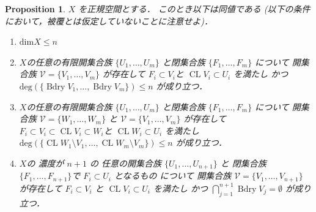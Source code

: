 \documentclass[leqno, a4paper, 12pt]{jsarticle}
\theoremstyle{plain}
\newtheorem{prop}[thm]{Proposition}
\theoremstyle{definition}
\theoremstyle{remark}
\DeclareMathOperator{\bd}{\mathrm{Bdry}}
\DeclareMathOperator{\cl}{\mathrm{CL}}
\newcommand{\yodim}{\mathrm{dim}}
\newcommand{\yodeg}{\mathrm{deg}}
\newcommand{\yocovf}[1]{\mathscr{#1}}
\numberwithin{equation}{section}
\begin{document}
\begin{prop}\label{prop:hihukudim3}
$X$
を正規空間とする．
このとき以下は同値である
(以下の条件において，被覆とは仮定していないことに注意せよ)．
\begin{enumerate}[label=\textup{(\arabic*)}]
\item\label{item:prop:dimn} 
$\yodim X\le n$


\item\label{item:prop:bdm} 

$X$の任意の有限開集合族
$\{U_{1}, \dots, U_{m}\}$
と閉集合族
$\{F_{1}, \dots, F_{m}\}$
について
開集合族
$\yocovf{V}=\{V_{1}, \dots, V_{m}\}$
が存在して
$F_{i}\subset V_{i}$と
$\cl V_{i}\subset U_{i}$
を満たし
かつ
$\yodeg(\{\bd V_{1}, \dots, \bd V_{m}\})\le n$
が成り立つ．


\item\label{item:prop:fatbdm} 
$X$の任意の有限開集合族
$\{U_{1}, \dots, U_{m}\}$
と閉集合族
$\{F_{1}, \dots, F_{m}\}$
について
開集合族
$\yocovf{V}=\{W_{1}, \dots, W_{m}\}$
と
$\yocovf{V}=\{V_{1}, \dots, V_{m}\}$
が存在して
$F_{i}\subset V_{i} \subset \cl V_{i}\subset W_{i}$と
$\cl W_{i}\subset U_{i}$
を満たし
$\yodeg(\{\cl W_{1}\setminus V_{1}, \dots, \cl W_{m}\setminus  V_{m}\})\le n$
が成り立つ．

\item\label{item:prop:bdn+1} 
$X$の
濃度が
$n+1$
の
任意の開集合族
$\{U_{1}, \dots, U_{n+1}\}$
と
閉集合族
$\{F_{1}, \dots, F_{n+1}\}$で
$F_{i}\subset U_{i}$
となるもの
について
開集合族
$\yocovf{V}=\{V_{1}, \dots, V_{n+1}\}$
が存在して
$F_{i}\subset V_{i}$
と
$\cl V_{i}\subset U_{i}$
を満たし
かつ
$\bigcap_{j=1}^{n+1}\bd V_{j}=\emptyset$
が成り立つ．





\end{enumerate}
\end{prop}
\end{document}

